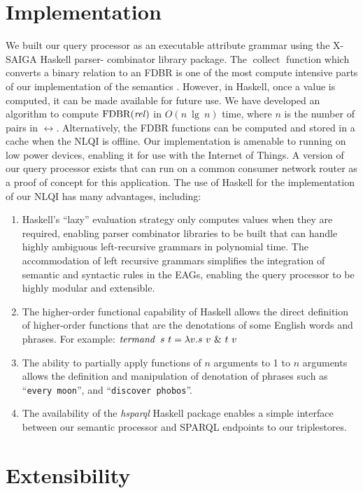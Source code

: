 \documentclass[../main.tex]{subfiles}
\begin{document}
\begin{refsection}
\section{Implementation}
\label{ext:implementation}
We built our query processor as an executable attribute grammar using the X-SAIGA Haskell parser-
combinator library package. %
The $\operatorname{collect}$ function which converts a binary relation to an FDBR is one of the most
compute intensive parts of our implementation of the semantics \cite{xsaiga}. However, in Haskell, once a value is
computed, it can be made available for future use. We have developed an algorithm to compute
$\operatorname{FDBR}({\operatorname{\mathit{rel}}})$ in $O(n\ \operatorname{lg}\ n)$ time, where $n$ is the number of pairs in $\rel$.
Alternatively, the FDBR functions can be computed and stored in a cache when the NLQI is offline.
Our implementation is amenable to running on low power devices, enabling it for use with the Internet of Things. A version of our query processor exists that can run on a common consumer network router as a proof of concept for this application.
The use of Haskell for the implementation of our NLQI has many advantages, including:
\begin{enumerate}
	\setlength\itemsep{0em}
	\item Haskell's ``lazy'' evaluation strategy only computes values when they are required, enabling parser combinator
	libraries to be built that can handle highly ambiguous left-recursive grammars in polynomial time. The accommodation of left recursive
	grammars simplifies the integration of semantic and syntactic rules in the EAGs, enabling the query processor to be highly modular and extensible.
	\item The higher-order functional capability of Haskell allows the direct definition of higher-order
	functions that are the denotations of some English words and phrases. For example: $ \opit{termand}\ s\ t = \lambda v.s\ v\ \&\ t\ v  $
	\item The ability to partially apply functions of $n$ arguments to 1 to $n$ arguments allows the
	definition and manipulation of denotation of phrases such as ``\texttt{every moon}'', and ``\texttt{discover
	phobos}''.
	\item The availability of the \textit{hsparql} \cite{hsparql} Haskell package enables a simple interface between our
	semantic processor and SPARQL endpoints to our triplestores.
\end{enumerate}

\section{Extensibility}
\label{ext:extensible}


\end{refsection}
\end{document}
